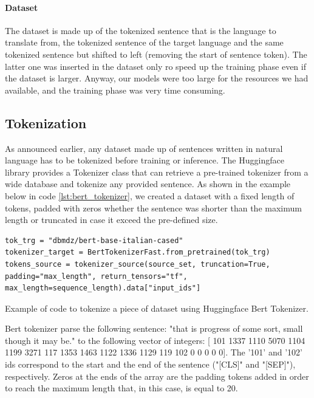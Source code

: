 \paragraph{Dataset} The dataset is made up of the tokenized sentence that is the language to translate from, the tokenized sentence of the target language and the same tokenized sentence but shifted to left (removing the start of sentence token). The latter one was inserted in the dataset only ro speed up the training phase even if the dataset is larger. Anyway, our models were too large for the resources we had available, and the training phase was very time consuming.

\subsection{Tokenization}
As announced earlier, any dataset made up of sentences written in natural language has to be tokenized before training or inference. The Huggingface library provides a Tokenizer class that can retrieve a pre-trained tokenizer from a wide database and tokenize any provided sentence. As shown in the example below in code \ref{lst:bert_tokenizer}, we created a dataset with a fixed length of tokens, padded with zeros whether the sentence was shorter than the maximum length or truncated in case it exceed the pre-defined size.
\begin{listing}[H]
\begin{verbatim}
tok_trg = "dbmdz/bert-base-italian-cased"
tokenizer_target = BertTokenizerFast.from_pretrained(tok_trg) 
tokens_source = tokenizer_source(source_set, truncation=True,                      padding="max_length", return_tensors="tf",                         max_length=sequence_length).data["input_ids"]
\end{verbatim}
\caption{Example of code to tokenize a piece of dataset using Huggingface Bert Tokenizer.}
\label{lst:bert_tokenizer}
\end{listing}
\begin{exmp}
Bert tokenizer parse the following sentence: "that is progress of some sort, small though it may be." to the following vector of integers: [ 101 1337 1110 5070 1104 1199 3271  117 1353 1463 1122 1336 1129 119 102 0 0 0 0 0]. The '101' and '102' ids correspond to the start and the end of the sentence ("[CLS]" and "[SEP]"), respectively. Zeros at the ends of the array are the padding tokens added in order to reach the maximum length that, in this case, is equal to 20.
\end{exmp}

